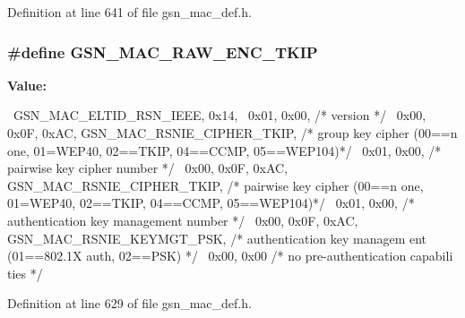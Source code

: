 Definition at line 641 of file gsn\_\-mac\_\-def.h.

\hypertarget{a00522_a1ced7ca9aa96a24131a432f100805486}{
\subsubsection[{GSN\_\-MAC\_\-RAW\_\-ENC\_\-TKIP}]{\setlength{\rightskip}{0pt plus 5cm}\#define GSN\_\-MAC\_\-RAW\_\-ENC\_\-TKIP}}
\label{a00522_a1ced7ca9aa96a24131a432f100805486}
{\bfseries Value:}
\begin{DoxyCode}
{{                                                                               
              \
    GSN_MAC_ELTID_RSN_IEEE, 0x14,                                                
                  \
    0x01, 0x00,                                 /* version                       
                                                */ \
    0x00, 0x0F, 0xAC, GSN_MAC_RSNIE_CIPHER_TKIP,    /* group key cipher    (00==n
      one, 01=WEP40, 02==TKIP, 04==CCMP, 05==WEP104)*/ \
    0x01, 0x00,                                 /* pairwise key cipher number    
                                                */ \
    0x00, 0x0F, 0xAC, GSN_MAC_RSNIE_CIPHER_TKIP,    /* pairwise key cipher (00==n
      one, 01=WEP40, 02==TKIP, 04==CCMP, 05==WEP104)*/ \
    0x01, 0x00,                                 /* authentication key management 
      number                                    */ \
    0x00, 0x0F, 0xAC, GSN_MAC_RSNIE_KEYMGT_PSK,     /* authentication key managem
      ent (01==802.1X auth, 02==PSK)                */ \
    0x00, 0x00                                  /* no pre-authentication capabili
      ties   */                                    \
}}
\end{DoxyCode}


Definition at line 629 of file gsn\_\-mac\_\-def.h.

